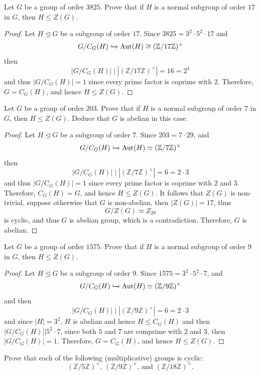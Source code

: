 \documentclass{article}
\newcommand{\Z}{\mathbb{Z}}
\newenvironment{problem}[2][Problem]{\begin{trivlist}
\item[\hskip \labelsep {\bfseries #1}\hskip \labelsep {\bfseries #2.}]}{\end{trivlist}}
\DeclareMathOperator{\Aut}{Aut}
\begin{document}
\begin{problem}{12}
    Let $G$ be a group of order $3825$. Prove that if $H$ is a normal subgroup of order $17$ in $G$, then $H \leq Z(G)$.
\end{problem}
\begin{proof}
    Let $H\trianglelefteq G$ be a subgroup of order $17$. Since $3825 = 3^2 \cdot 5^2 \cdot 17$ and 
    \[
        G/C_G(H)\xhookrightarrow{}\Aut(H)\cong (\Z/17\Z)^{\times}
    \]
    then 
    \[
        |G/C_G(H)|\mid |(\Z/17\Z)^{\times}|=16=2^4
    \]
    and thus $|G/C_G(H)|=1$ since every prime factor is coprime with $2$. Therefore, $G=C_G(H)$, and hence $H \leq Z(G)$.
\end{proof}
\begin{problem}{13}
    Let $G$ be a group of order $203$. Prove that if $H$ is a normal subgroup of order $7$ in $G$, then $H \leq Z(G)$. Deduce that $G$ is abelian in this case.
\end{problem}
\begin{proof}
    Let $H\trianglelefteq G$ be a subgroup of order $7$. Since $203=7\cdot 29$, and 
    \[
        G/C_G(H) \xhookrightarrow{} \Aut(H)\simeq (\Z/7\Z)^{\times}
    \]
    then 
    \[
        |G/C_G(H)|\mid |(\Z/7\Z)^{\times}|=6=2\cdot 3
    \]
    and thus $|G/C_G(H)|=1$ since every prime factor is coprime with $2$ and $3$. Therefore, $C_G(H)=G$, and hence $H\leq Z(G)$. It follows that $Z(G)$ is non-trivial, suppose otherwise that $G$ is non-abelian, then $|Z(G)|=17$, thus
    \[
        G/Z(G) \simeq Z_{29}
    \]
    is cyclic, and thus $G$ is abelian group, which is a contradiction. Therefore, $G$ is abelian.
\end{proof}
\begin{problem}{14}
    Let $G$ be a group of order $1575$. Prove that if $H$ is a normal subgroup of order $9$ in $G$, then $H \leq Z(G)$.
\end{problem}
\begin{proof}
    Let $H \trianglelefteq G$ be a subgroup of order 9. Since $1575=3^2\cdot 5^2 \cdot 7$, and 
    \[
            G/C_G(H) \xhookrightarrow{} \Aut(H)\simeq (\Z/9\Z)^{\times}
    \]
    and then
    \[
        |G/C_G(H)|\mid |(\Z/9\Z)^{\times}|=6=2\cdot 3
    \]
    and since $|H|=3^2$, $H$ is abelian and hence $H\leq C_G(H)$ and then $|G/C_G(H)||5^2\cdot 7$, since both $5$ and $7$ are comprime with $2$ and $3$, then $|G/C_G(H)|=1$. Therefore, $G=C_G(H)$, and hence $H\leq Z(G)$. 
\end{proof}
\begin{problem}{15}
    Prove that each of the following (multiplicative) groups is cyclic:
\[
(\mathbb{Z}/5\mathbb{Z})^\times, \, (\mathbb{Z}/9\mathbb{Z})^\times, \, \text{and } (\mathbb{Z}/18\mathbb{Z})^\times.
\]
\end{problem}
\end{document}
